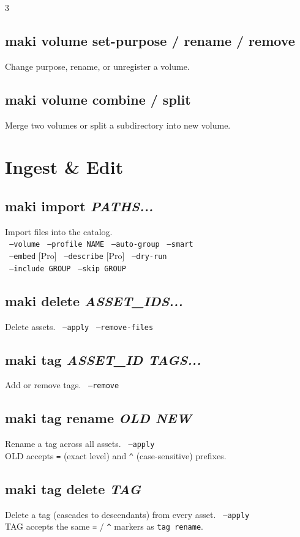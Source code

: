 \documentclass[a4paper,landscape,8pt]{article}
\newcommand{\cmd}[1]{\texttt{\footnotesize #1}}
\newcommand{\opt}[1]{\texttt{\scriptsize\color{maki-stone} #1}}
\newcommand{\pro}{\textcolor{maki-teal}{\scriptsize [Pro]}}
\begin{document}
\begin{multicols}{3}
\subsection{maki volume set-purpose / rename / remove}
Change purpose, rename, or unregister a volume.

\subsection{maki volume combine / split}
Merge two volumes or split a subdirectory into new volume.

\section{Ingest \& Edit}

\subsection{maki import \textit{PATHS...}}
Import files into the catalog. \\
\opt{--volume} \opt{--profile NAME} \opt{--auto-group} \opt{--smart} \\
\opt{--embed} \pro{} \opt{--describe} \pro{} \opt{--dry-run} \\
\opt{--include GROUP} \opt{--skip GROUP}

\subsection{maki delete \textit{ASSET\_IDS...}}
Delete assets. \opt{--apply} \opt{--remove-files}

\subsection{maki tag \textit{ASSET\_ID TAGS...}}
Add or remove tags. \opt{--remove}

\subsection{maki tag rename \textit{OLD NEW}}
Rename a tag across all assets. \opt{--apply} \\
OLD accepts \cmd{=} (exact level) and \cmd{\textasciicircum} (case-sensitive) prefixes.

\subsection{maki tag delete \textit{TAG}}
Delete a tag (cascades to descendants) from every asset. \opt{--apply} \\
TAG accepts the same \cmd{=} / \cmd{\textasciicircum} markers as \cmd{tag rename}.


\end{multicols}
\end{document}
